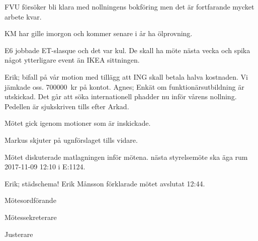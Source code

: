 \documentclass[10pt]{article}
\def\mo{Erik Månsson}
\def\ms{Johan Karlberg}
\def\ji{}
\begin{document}
\begin{paragrafer}
\begin{paragrafer}
FVU försöker bli klara med nollningens bokföring men det är fortfarande mycket arbete kvar.

KM har gille imorgon och kommer senare i år ha ölprovning.

E6 jobbade ET-slasque och det var kul. De skall ha möte nästa vecka och spika något ytterligare event än IKEA sittningen.

Erik; bifall på vår motion med tillägg att ING skall betala halva kostnaden. Vi jämkade oss.
\SI{700000}{kr} på kontot.
Agnes; Enkät om funktionärsutbildning är utskickad. Det går att söka internationell phadder nu inför vårens nollning. Pedellen är sjukskriven tills efter Arkad.
\end{paragrafer}

Mötet gick igenom motioner som är inskickade.

Markus skjuter på ugnförslaget tills vidare.

Mötet diskuterade matlagningen inför mötena.
{\Mba} nästa styrelsemöte ska äga rum 2017-11-09 12:10 i E:1124.

{\Ibfu}

Erik; städschema!
{\mo} förklarade mötet avslutat 12:44.

\end{paragrafer}

\hidesignfoot
\begin{signatures}{3}
\signature{\mo}{Mötesordförande}
\signature{\ms}{Mötessekreterare}
\signature{\ji}{Justerare}
\end{signatures}
\end{document}
